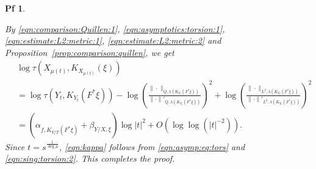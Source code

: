 \documentclass[10pt,a4paper]{amsart}
\newtheorem{pf}{Pf}
\begin{document}
\begin{pf}
\begin{equation}
\end{equation}
\par
By \eqref{eqn:comparison:Quillen:1}, \eqref{eqn:asymptotics:torsion:1}, \eqref{eqn:estimate:L2:metric:1}, \eqref{eqn:estimate:L2:metric:2}
and Proposition~\ref{prop:comparison:quillen}, we get
\begin{equation}
\label{eqn:sing:torsion:2}
\begin{aligned}
\,&
\log\tau(X_{\mu(t)}, K_{X_{\mu(t)}}(\xi))
\\
&=
\log\tau(Y_{t}, K_{Y_{t}}(F^{*}\xi))
-
\log\left(\frac{\|\cdot\|_{Q,\lambda(K_{Y_{t}}(F^{*}\xi))}}{\|\cdot\|'_{Q,\lambda(K_{Y_{t}}(F^{*}\xi))}}\right)^{2}
+
\log\left(\frac{\|\cdot\|_{L^{2},\lambda(K_{Y_{t}}(F^{*}\xi))}}{\|\cdot\|'_{L^{2},\lambda(K_{Y_{t}}(F^{*}\xi))}}\right)^{2}
\\
&=
( \alpha_{f, K_{Y/T}(F^{*}\xi)} + \beta_{Y/X, \xi} ) \log | t |^{2} + O\left( \log\log(| t |^{-2}) \right).
\end{aligned}
\end{equation}
Since $t=s^{\frac{1}{\deg\mu}}$, \eqref{eqn:kappa} follows from \eqref{eqn:asymp:eq:tors} and \eqref{eqn:sing:torsion:2}. 
This completes the proof.
\end{pf}
\end{document}
